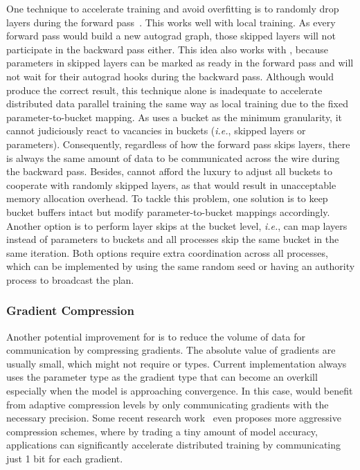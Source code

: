 One technique to accelerate training and avoid overfitting is to randomly drop layers during the forward pass~\cite{fan2019reducing}. This works well with local training. As every forward pass would build a new autograd graph, those skipped layers will not participate in the backward pass either. This idea also works with , because parameters in skipped layers can be marked as ready in the forward pass and  will not wait for their autograd hooks during the backward pass. Although  would produce the correct result, this technique alone is inadequate to accelerate distributed data parallel training the same way as local training due to the fixed parameter-to-bucket mapping. As  uses a bucket as the minimum granularity, it cannot judiciously react to vacancies in buckets (\emph{i.e.}, skipped layers or parameters). Consequently, regardless of how the forward pass skips layers, there is always the same amount of data to be communicated across the wire during the backward pass. Besides,  cannot afford the luxury to adjust all buckets to cooperate with randomly skipped layers, as that would result in unacceptable memory allocation overhead. To tackle this problem, one solution is to keep bucket buffers intact but modify parameter-to-bucket mappings accordingly. Another option is to perform layer skips at the bucket level, \emph{i.e.},  can map layers instead of parameters to buckets and all processes skip the same bucket in the same iteration. Both options require extra coordination across all  processes, which can be implemented by using the same random seed or having an authority process to broadcast the plan.

\subsubsection{Gradient Compression}

Another potential improvement for  is to reduce the volume of data for communication by compressing gradients. The absolute value of gradients are usually small, which might not require  or  types. Current  implementation always uses the parameter type as the gradient type that can become an overkill especially when the model is approaching convergence. In this case,  would benefit from adaptive compression levels by only communicating gradients with the necessary precision. Some recent research work~\cite{seide2014} even proposes more aggressive compression schemes, where by trading a tiny amount of model accuracy, applications can significantly accelerate distributed training by communicating just 1 bit for each gradient. 

